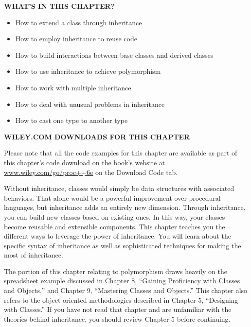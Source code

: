 \noindent
\textbf{WHAT’S IN THIS CHAPTER?}

\begin{itemize}
\item
How to extend a class through inheritance

\item
How to employ inheritance to reuse code

\item
How to build interactions between base classes and derived classes

\item
How to use inheritance to achieve polymorphism

\item
How to work with multiple inheritance

\item
How to deal with unusual problems in inheritance

\item
How to cast one type to another type
\end{itemize}

\noindent
\textbf{WILEY.COM DOWNLOADS FOR THIS CHAPTER}

Please note that all the code examples for this chapter are available as part of this chapter’s code download on the book’s website at \url{www.wiley.com/go/proc++6e} on the Download Code tab.

Without inheritance, classes would simply be data structures with associated behaviors. That alone would be a powerful improvement over procedural languages, but inheritance adds an entirely new dimension. Through inheritance, you can build new classes based on existing ones. In this way, your classes become reusable and extensible components. This chapter teaches you the different ways to leverage the power of inheritance. You will learn about the specific syntax of inheritance as well as sophisticated techniques for making the most of inheritance.

The portion of this chapter relating to polymorphism draws heavily on the spreadsheet example discussed in Chapter 8, “Gaining Proficiency with Classes and Objects,” and Chapter 9, “Mastering Classes and Objects.” This chapter also refers to the object-oriented methodologies described in Chapter 5, “Designing with Classes.” If you have not read that chapter and are unfamiliar with the theories behind inheritance, you should review Chapter 5 before continuing.






























